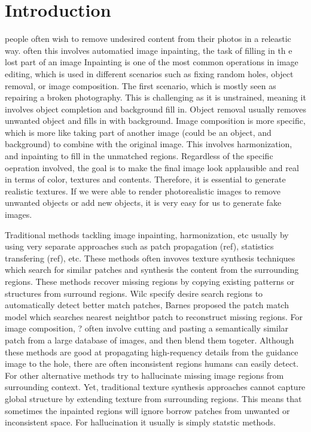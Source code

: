 \documentclass[runningheads]{llncs}
\begin{document}
\section{Introduction}
people often wish to remove undesired content from their photos in a  releastic way. often this involves automatied image inpainting, the task of filling in th e lost part of an image
Inpainting is one of the most common operations in image editing, which is used in different scenarios such as fixing random holes, object removal, or image composition. The first scenario, which is mostly seen as repairing a broken photography. This is challenging as it is unstrained, meaning it involves object completion and background fill in. Object removal usually removes unwanted object and fills in with background. Image composition is more specific, which is more like taking part of another image (could be an object, and background) to combine with the original image. This involves harmonization, and inpainting to fill in the unmatched regions. Regardless of the specific oepration involved, the goal is to make the final image look applausible and real in terms of color, textures and contents. Therefore, it is essential to generate realistic textures. If we were able to render photorealistic images to remove unwanted objects or add new objects, it is very easy for us to generate fake images.

Traditional methods tackling image inpainting, harmonization, etc usually by using very separate approaches such as patch propagation (ref), statistics transfering (ref), etc. These methods often invoves texture synthesis techniques which search for similar patches and synthesis the content from the surrounding regions. These methods recover missing regions by copying existing patterns or structures from surround regions. Wilc specify desire search regions to automatically detect better match patches, Barnes proposed the patch match model which searches nearest neightbor patch to reconstruct missing regions. For image composition, ? often involve cutting and pasting a semantically similar patch from a large database of images, and then blend them togeter. Although these methods are good at propagating high-requency details from the guidance image to the hole, there are often inconsistent regions humans can easily detect. For other alternative methods try to hallucinate missing image regions from surrounding context. Yet, traditional texture synthesis approaches cannot capture global structure by extending texture from surrounding regions. This means that sometimes the inpainted regions will ignore borrow patches from unwanted or inconsistent space. For hallucination it usually is simply statstic methods.
\end{document}
